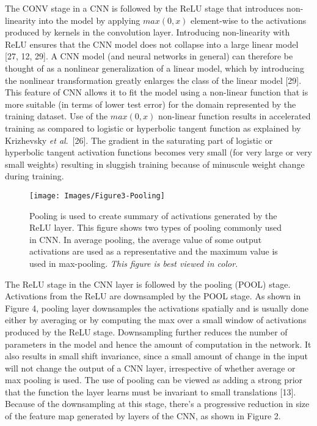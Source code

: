 \documentclass [11pt,letterpaper ,twoside ,openany ]{report}
\begin{document}
    The CONV stage in a CNN is followed by the ReLU stage that introduces non-linearity into the model by applying \(max (0,x)\) element-wise to the activations produced by kernels in the convolution layer. Introducing non-linearity with ReLU ensures that the CNN model does not collapse into a large linear model [27, 12, 29]. A CNN model (and neural networks in general) can therefore be thought of as a nonlinear generalization of a linear model, which by introducing the nonlinear transformation greatly enlarges the class of the linear model [29]. This feature of CNN allows it to fit the model using a non-linear function that is more suitable (in terms of lower test error) for the domain represented by the training dataset. Use of the \(max (0,x)\) non-linear function results in accelerated training as compared to logistic or hyperbolic tangent function as explained by Krizhevsky \textit{et al}.\ [26]. The gradient in the saturating part of logistic or hyperbolic tangent activation functions becomes very small (for very large or very small weights) resulting in sluggish training because of minuscule weight change during training.

    \begin{wrapfigure}{r}{0.5\textwidth}
        \begin{center}
            \texttt{[image: Images/Figure3-Pooling]}
        \end{center}
        \caption{Pooling is used to create summary of activations generated by the ReLU layer. This figure shows two types of pooling commonly used in CNN. In average pooling, the average value of some output activations are used as a representative and the maximum value is used in max-pooling. \textit{This figure is best viewed in color.}}
    \end{wrapfigure}    

    The ReLU stage in the CNN layer is followed by the pooling (POOL) stage. Activations from the ReLU are downsampled by the POOL stage. As shown in Figure 4, pooling layer downsamples the activations spatially and is usually done either by averaging or by computing the max over a small window of activations produced by the ReLU stage. Downsampling further reduces the number of parameters in the model and hence the amount of computation in the network. It also results in small shift invariance, since a small amount of change in the input will not change the output of a CNN layer, irrespective of whether average or max pooling is used. The use of pooling can be viewed as adding a strong prior that the function the layer learns must be invariant to small translations [13]. Because of the downsampling at this stage, there's a progressive reduction in size of the feature map generated by layers of the CNN, as shown in Figure 2. \\ 
\end{document}
